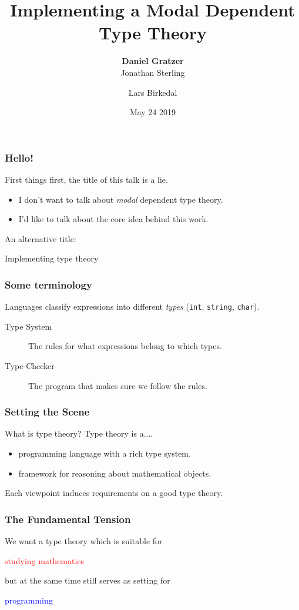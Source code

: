 \documentclass[usenames,dvipsnames,aspectratio=169,12pt]{beamer}
\title{Implementing a Modal Dependent Type Theory}
\author{\textbf{Daniel Gratzer}\inst{1}\\%
  Jonathan Sterling\inst{2} \and Lars Birkedal\inst{1}}
\institute{\inst{1} This University \smiley{} \\ \inst{2} Not This University \frownie{}}
\date{May 24 2019}
\begin{document}
\begin{frame}[noframenumbering]
  \titlepage
\end{frame}

\begin{frame}
  \frametitle{Hello!}
  First things first, the title of this talk is a lie.
  \pause

  \begin{itemize}
  \item I don't want to talk about \emph{modal} dependent type theory.
  \item I'd like to talk about the core idea behind this work.
  \end{itemize}
  \pause
  \bigskip

  An alternative title:
  \begin{center}
    \color{Blue}
    \Large
    Implementing type theory
  \end{center}

\end{frame}

\begin{frame}
  \frametitle{Some terminology}
  Languages classify expressions into different \emph{types} (\texttt{int},
  \texttt{string}, \texttt{char}).
  \pause

  \begin{description}
  \item[Type System] The rules for what expressions belong to which types.
  \item[Type-Checker] The program that makes sure we follow the rules.
  \end{description}

\end{frame}

\begin{frame}
  \frametitle{Setting the Scene}

  What is type theory? Type theory is a....
  \begin{itemize}
  \item programming language with a rich type system.
  \item framework for reasoning about mathematical objects.
  \end{itemize}
  \pause
  \bigskip


  Each viewpoint induces requirements on a good type theory.
\end{frame}

\begin{frame}
  \frametitle{The Fundamental Tension}

  We want a type theory which is suitable for

  \begin{center}
    \textcolor{Red}{studying mathematics}
  \end{center}

  but at the same time still serves as setting for

  \begin{center}
    \textcolor{Blue}{programming}
  \end{center}

\end{frame}
\end{document}
